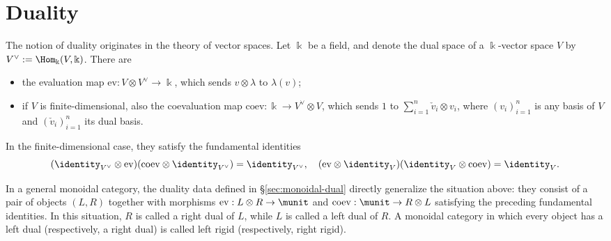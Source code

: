 
\hypertarget{o014.aljabr2.chapter9.duality-a}{ }
\chapter{Duality}\label{sec:duality}

The notion of duality originates in the theory of vector spaces. Let
$\Bbbk$ be a field, and denote the dual space of a $\Bbbk$-vector space $V$
by $V^\vee:=\Hom_{\Bbbk}(V,\Bbbk)$. There are
\begin{itemize}
	\item the evaluation map $\mathrm{ev}:V\otimes V^\vee\to\Bbbk$, which
	sends $v\otimes\lambda$ to $\lambda(v)$;
	\item if $V$ is finite-dimensional, also the coevaluation map
	$\mathrm{coev}:\Bbbk\to V^\vee\otimes V$, which sends $1$ to
	$\sum_{i=1}^n\check{v}_i\otimes v_i$, where $(v_i)_{i=1}^n$ is any basis
	of $V$ and $(\check{v}_i)_{i=1}^n$ its dual basis.
\end{itemize}

In the finite-dimensional case, they satisfy the fundamental identities
\[ (\identity_{V^\vee} \otimes \mathrm{ev})(\mathrm{coev} \otimes \identity_{V^\vee}) = \identity_{V^\vee}, \quad (\mathrm{ev} \otimes \identity_V) (\identity_V \otimes \mathrm{coev}) = \identity_V. \]

In a general monoidal category, the duality data defined in
\S\ref{sec:monoidal-dual} directly generalize the situation above: they
consist of a pair of objects $(L,R)$ together with morphisms
$\mathrm{ev}:L\otimes R\to\munit$ and
$\mathrm{coev}:\munit\to R\otimes L$ satisfying the preceding fundamental
identities. In this situation, $R$ is called a right dual of $L$, while $L$
is called a left dual of $R$. A monoidal category in which every object has
a left dual (respectively, a right dual) is called left rigid (respectively,
right rigid).

